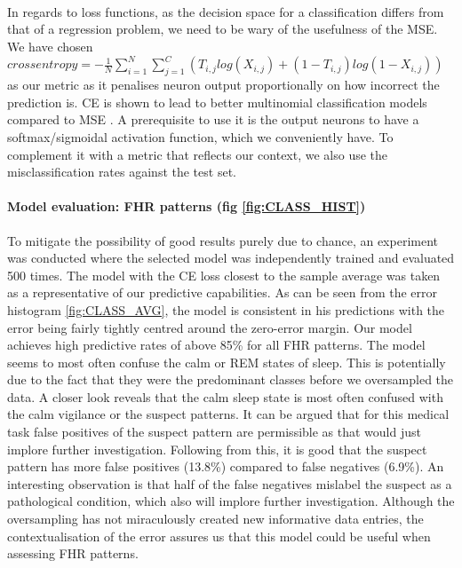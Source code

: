 \documentclass[11pt,a4paper]{article}
\begin{document}
\paragraph{}
In regards to loss functions, as the decision space for a classification differs from that of a regression problem, we need to be wary of the usefulness of the MSE. We have chosen \(crossentropy = -\frac{1}{N}\sum_{i=1}^N\sum_{j=1}^C(T_{i,j}log(X_{i,j})+(1 - T_{i,j})log(1-X_{i,j}))\) as our metric as it penalises neuron output proportionally on how incorrect the prediction is. CE is shown to lead to better multinomial classification models compared to MSE \autocite{Golik2013CrossentropyVS}. A prerequisite to use it is the output neurons to have a softmax/sigmoidal activation function, which we conveniently have. To complement it with a metric that reflects our context, we also use the misclassification rates against the test set.

\paragraph{Model evaluation: FHR patterns (fig \ref{fig:CLASS_HIST})}
To mitigate the possibility of good results purely due to chance, an experiment was conducted where the selected model was independently trained and evaluated 500 times. The model with the CE loss closest to the sample average was taken as a representative of our predictive capabilities. As can be seen from the error histogram \ref{fig:CLASS_AVG}, the model is consistent in his predictions with the error being fairly tightly centred around the zero-error margin. Our model achieves high predictive rates of above 85\% for all FHR patterns. The model seems to most often confuse the calm or REM states of sleep. This is potentially due to the fact that they were the predominant classes before we oversampled the data. A closer look reveals that the calm sleep state is most often confused with the calm vigilance or the suspect patterns. It can be argued that for this medical task false positives of the suspect pattern are permissible as that would just implore further investigation. Following from this, it is good that the suspect pattern has more false positives (13.8\%) compared to false negatives (6.9\%). An interesting observation is that half of the false negatives mislabel the suspect as a pathological condition, which also will implore further investigation. Although the oversampling has not miraculously created new informative data entries, the contextualisation of the error assures us that this model could be useful when assessing FHR patterns.
\end{document}
